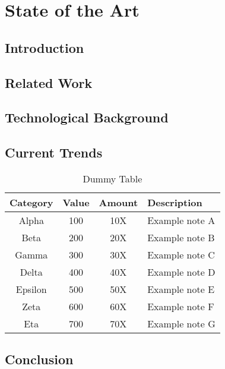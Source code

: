\newpage
\chapter{State of the Art}
\section{Introduction}
\lipsum[1]
\section{Related Work}
\lipsum[2] \citep{placeholder}
\section{Technological Background}
\lipsum[3] \citep{placeholder}
\section{Current Trends}
\lipsum[4]  \lipsum[5][1-4]

\begin{table}[H]
    \centering
    \setlength{\tabcolsep}{4pt}
    \renewcommand{\arraystretch}{1.1}
    \begin{tabularx}{\textwidth}{c c c X}
        \toprule
        \textbf{Category} & \textbf{Value} & \textbf{Amount} & \textbf{Description} \\
        \midrule
        Alpha & 100 & 10X & Example note A \\
        \midrule
        Beta & 200 & 20X & Example note B \\
        \midrule
        Gamma & 300 & 30X & Example note C \\
        \midrule
        Delta & 400 & 40X & Example note D \\
        \midrule
        Epsilon & 500 & 50X & Example note E \\
        \midrule
        Zeta & 600 & 60X & Example note F \\
        \midrule
        Eta & 700 & 70X & Example note G \\
        \bottomrule
    \end{tabularx}
    \caption{Dummy Table}\label{tab:dummy_table}
\end{table}

\section{Conclusion}
\lipsum[5]